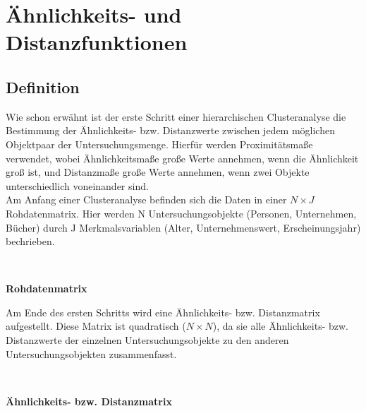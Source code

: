 \documentclass[12pt,titlepage]{article}
\begin{document}
	
	\section{Ähnlichkeits- und Distanzfunktionen}
		\subsection{Definition}
			Wie schon erwähnt ist der erste Schritt einer hierarchischen Clusteranalyse die Bestimmung der Ähnlichkeits- bzw. Distanzwerte zwischen jedem möglichen Objektpaar der Untersuchungsmenge. Hierfür werden Proximitätsmaße verwendet, wobei Ähnlichkeitsmaße große Werte annehmen, wenn die Ähnlichkeit groß ist, und Distanzmaße große Werte annehmen, wenn zwei Objekte unterschiedlich voneinander sind. \\
Am Anfang einer Clusteranalyse befinden sich die Daten in einer $N\times J$ Rohdatenmatrix. Hier werden N Untersuchungsobjekte (Personen, Unternehmen, Bücher) durch J Merkmalsvariablen (Alter, Unternehmenswert, Erscheinungsjahr) bechrieben. \\

\centerline{ \\
}
\centerline{\textbf{Rohdatenmatrix}}
\centerline{}

Am Ende des ersten Schritts wird eine Ähnlichkeits- bzw. Distanzmatrix aufgestellt. Diese Matrix ist quadratisch ($N\times N$), da sie alle Ähnlichkeits- bzw. Distanzwerte der einzelnen Untersuchungsobjekte zu den anderen Untersuchungsobjekten zusammenfasst.

\centerline{ \\
}
\centerline{\textbf{Ähnlichkeits- bzw. Distanzmatrix}} 
\centerline{}
\end{document}

